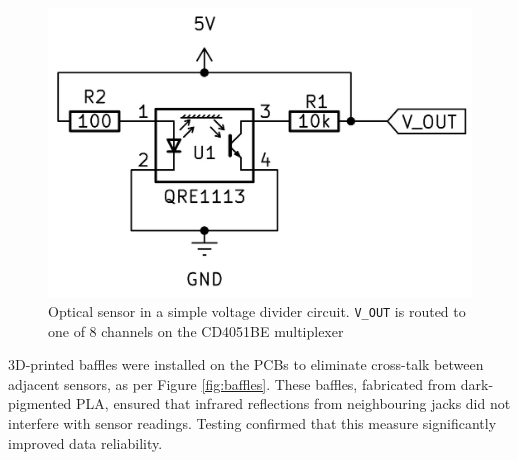 \begin{figure}  
  \centering
  \includegraphics[width=\linewidth]{src/images/simple-schematic-bw-.jpg} 
  \caption{Optical sensor in a simple voltage divider circuit. \texttt{V\_OUT} is routed to one of 8 channels on the CD4051BE multiplexer}
  \Description{} 
  \label{fig:simple-schematic}
\end{figure}



3D-printed baffles were installed on the PCBs to eliminate cross-talk between adjacent sensors, as per Figure \ref{fig:baffles}. These baffles, fabricated from dark-pigmented PLA, ensured that infrared reflections from neighbouring jacks did not interfere with sensor readings. Testing confirmed that this measure significantly improved data reliability.


